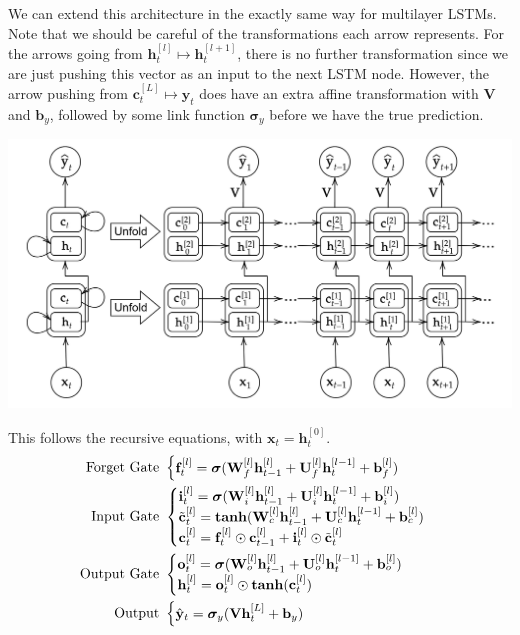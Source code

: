 \documentclass{article}
\theoremstyle{definition}
\theoremstyle{remark}
\theoremstyle{definition}
\begin{document}
We can extend this architecture in the exactly same way for multilayer LSTMs. Note that we should be careful of the transformations each arrow represents. For the arrows going from $\mathbf{h}_{t}^{[l]} \mapsto \mathbf{h}_{t}^{[l+1]}$, there is no further transformation since we are just pushing this vector as an input to the next LSTM node. However, the arrow pushing from $\mathbf{c}_t^{[L]} \mapsto \hat{\mathbf{y}}_{t}$ does have an extra affine transformation with $\mathbf{V}$ and $\mathbf{b}_y$, followed by some link function $\boldsymbol{\sigma}_y$ before we have the true prediction.  
\begin{center}
    \includegraphics[scale=0.3]{img/RNNs/multilayer_LSTM.png}
\end{center}
This follows the recursive equations, with $\mathbf{x}_t = \mathbf{h}^{[0]}_{t}$. 
\begin{align*}
    \text{Forget Gate } & \begin{cases} \mathbf{f}_t^{[l]} = \boldsymbol{\sigma}( \mathbf{W}_f^{[l]} \mathbf{h}_{t-1}^{[l]} + \mathbf{U}_f^{[l]} \mathbf{h}_t^{[l-1]} + \mathbf{b}_f^{[l]} ) \end{cases} \\
    \text{Input Gate } & \begin{cases} \mathbf{i}_t^{[l]} = \boldsymbol{\sigma}( \mathbf{W}_i^{[l]} \mathbf{h}_{t-1}^{[l]} + \mathbf{U}_i^{[l]} \mathbf{h}_t^{[l-1]} + \mathbf{b}_i^{[l]} ) \\
        \Tilde{\mathbf{c}}_t^{[l]} = \boldsymbol{\tanh}( \mathbf{W}_c^{[l]} \mathbf{h}_{t-1}^{[l]} + \mathbf{U}_c^{[l]} \mathbf{h}_t^{[l-1]} + \mathbf{b}_c^{[l]} ) \\ 
        \mathbf{c}_t^{[l]} = \mathbf{f}_t^{[l]} \odot \mathbf{c}_{t-1}^{[l]} + \mathbf{i}_t^{[l]} \odot \Tilde{\mathbf{c}}_t^{[l]}  \end{cases} \\
        \text{Output Gate } & \begin{cases} \mathbf{o}_t^{[l]} = \boldsymbol{\sigma}( \mathbf{W}_o^{[l]} \mathbf{h}_{t-1}^{[l]} + \mathbf{U}_o^{[l]} \mathbf{h}_t^{[l-1]} + \mathbf{b}_o^{[l]} ) \\
        \mathbf{h}_t^{[l]} = \mathbf{o}_t^{[l]} \odot \boldsymbol{\tanh}(\mathbf{c}_t^{[l]})
         \end{cases} \\
         \text{Output } & \begin{cases} \hat{\mathbf{y}}_t = \boldsymbol{\sigma}_y ( \mathbf{V} \mathbf{h}_t^{[L]} + \mathbf{b}_y) \end{cases}
\end{align*}
\end{document}
